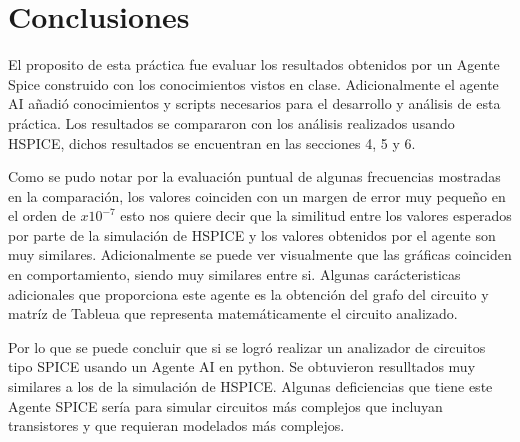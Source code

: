 \section{Conclusiones}
El proposito de esta práctica fue evaluar los resultados obtenidos por un Agente Spice construido con los conocimientos vistos en clase. Adicionalmente el agente AI añadió conocimientos y scripts necesarios para el desarrollo y análisis de esta práctica. Los resultados se compararon con los análisis realizados usando HSPICE, dichos resultados se encuentran en las secciones 4, 5 y 6. 

Como se pudo notar por la evaluación puntual de algunas frecuencias mostradas en la comparación, los valores coinciden con un margen de error muy pequeño en el orden de $x10^{-7}$ esto  nos quiere decir que la similitud entre los valores esperados por parte de la simulación de HSPICE y los valores obtenidos por el agente son muy similares.
Adicionalmente se puede ver visualmente que las gráficas coinciden en comportamiento, siendo muy similares entre si.
Algunas carácteristicas adicionales que proporciona este agente es la obtención del grafo del circuito y matríz de Tableua que representa matemáticamente el circuito analizado.

Por lo que se puede concluir que si se logró realizar un analizador de circuitos tipo SPICE usando un Agente AI en python. Se obtuvieron resulltados muy similares a los de la simulación de HSPICE. Algunas deficiencias que tiene este Agente SPICE sería para simular circuitos más complejos que incluyan transistores y que requieran modelados más complejos.
